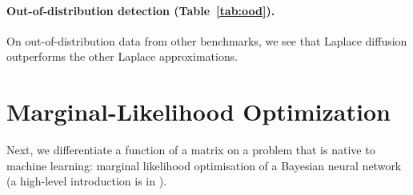 \paragraph{Out-of-distribution detection (Table~\ref{tab:ood}).}
On out-of-distribution data from other benchmarks, we see that Laplace diffusion outperforms the other Laplace approximations.





\section{Marginal-Likelihood Optimization}
\label{sec:marginal_likelihood_optimization}
Next, we differentiate a function of a matrix on a problem that is native to machine learning: marginal likelihood optimisation of a Bayesian neural network (a high-level introduction is in ).



